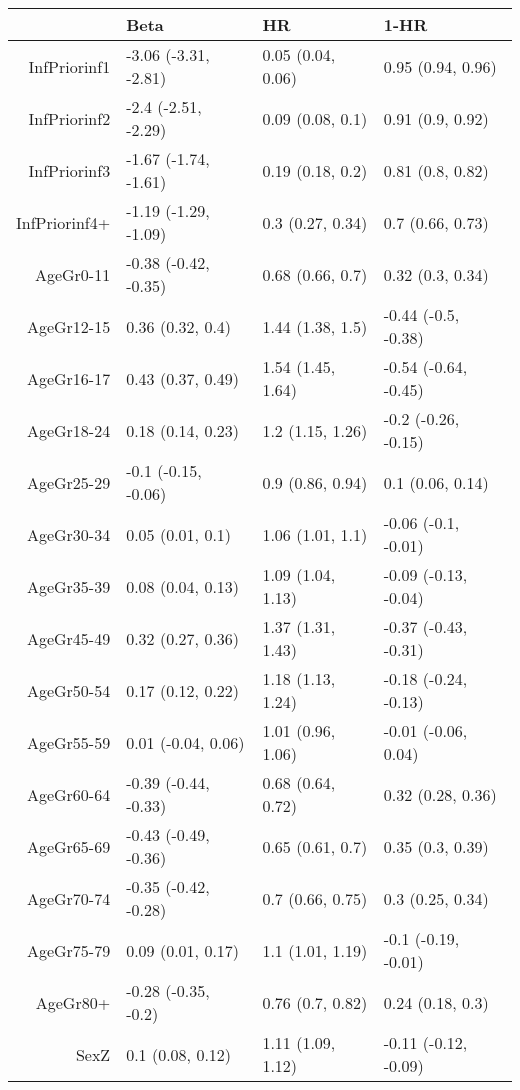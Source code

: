 \begin{table}[ht]
\centering
\begin{tabular}{rlll}
  \hline
 & Beta & HR & 1-HR \\ 
  \hline
InfPriorinf1 & -3.06 (-3.31, -2.81) & 0.05 (0.04, 0.06) & 0.95 (0.94, 0.96) \\ 
  InfPriorinf2 & -2.4 (-2.51, -2.29) & 0.09 (0.08, 0.1) & 0.91 (0.9, 0.92) \\ 
  InfPriorinf3 & -1.67 (-1.74, -1.61) & 0.19 (0.18, 0.2) & 0.81 (0.8, 0.82) \\ 
  InfPriorinf4+ & -1.19 (-1.29, -1.09) & 0.3 (0.27, 0.34) & 0.7 (0.66, 0.73) \\ 
  AgeGr0-11 & -0.38 (-0.42, -0.35) & 0.68 (0.66, 0.7) & 0.32 (0.3, 0.34) \\ 
  AgeGr12-15 & 0.36 (0.32, 0.4) & 1.44 (1.38, 1.5) & -0.44 (-0.5, -0.38) \\ 
  AgeGr16-17 & 0.43 (0.37, 0.49) & 1.54 (1.45, 1.64) & -0.54 (-0.64, -0.45) \\ 
  AgeGr18-24 & 0.18 (0.14, 0.23) & 1.2 (1.15, 1.26) & -0.2 (-0.26, -0.15) \\ 
  AgeGr25-29 & -0.1 (-0.15, -0.06) & 0.9 (0.86, 0.94) & 0.1 (0.06, 0.14) \\ 
  AgeGr30-34 & 0.05 (0.01, 0.1) & 1.06 (1.01, 1.1) & -0.06 (-0.1, -0.01) \\ 
  AgeGr35-39 & 0.08 (0.04, 0.13) & 1.09 (1.04, 1.13) & -0.09 (-0.13, -0.04) \\ 
  AgeGr45-49 & 0.32 (0.27, 0.36) & 1.37 (1.31, 1.43) & -0.37 (-0.43, -0.31) \\ 
  AgeGr50-54 & 0.17 (0.12, 0.22) & 1.18 (1.13, 1.24) & -0.18 (-0.24, -0.13) \\ 
  AgeGr55-59 & 0.01 (-0.04, 0.06) & 1.01 (0.96, 1.06) & -0.01 (-0.06, 0.04) \\ 
  AgeGr60-64 & -0.39 (-0.44, -0.33) & 0.68 (0.64, 0.72) & 0.32 (0.28, 0.36) \\ 
  AgeGr65-69 & -0.43 (-0.49, -0.36) & 0.65 (0.61, 0.7) & 0.35 (0.3, 0.39) \\ 
  AgeGr70-74 & -0.35 (-0.42, -0.28) & 0.7 (0.66, 0.75) & 0.3 (0.25, 0.34) \\ 
  AgeGr75-79 & 0.09 (0.01, 0.17) & 1.1 (1.01, 1.19) & -0.1 (-0.19, -0.01) \\ 
  AgeGr80+ & -0.28 (-0.35, -0.2) & 0.76 (0.7, 0.82) & 0.24 (0.18, 0.3) \\ 
  SexZ & 0.1 (0.08, 0.12) & 1.11 (1.09, 1.12) & -0.11 (-0.12, -0.09) \\ 
   \hline
\end{tabular}
\end{table}
